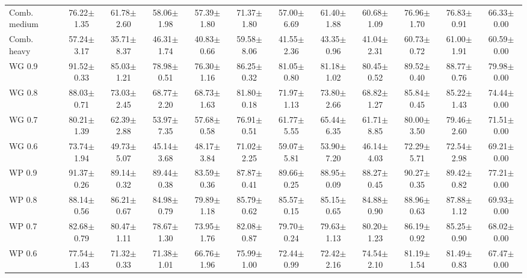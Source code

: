 \begin{table}[!t]
{\begin{tabular}{lccccccccccc}
Comb. medium & 76.22$\pm$1.35 & 61.78$\pm$2.60 & 58.06$\pm$1.98 & 57.39$\pm$1.80 & 71.37$\pm$1.80 & 57.00$\pm$6.69 & 61.40$\pm$1.88 & 60.68$\pm$1.09 & 76.96$\pm$1.70 & 76.83$\pm$0.91 & 66.33$\pm$0.00 \\
Comb. heavy & 57.24$\pm$3.17 & 35.71$\pm$8.37 & 46.31$\pm$1.74 & 40.83$\pm$0.66 & 59.58$\pm$8.06 & 41.55$\pm$2.36 & 43.35$\pm$0.96 & 41.04$\pm$2.31 & 60.73$\pm$0.72 & 61.00$\pm$1.91 & 60.59$\pm$0.00 \\
WG 0.9 & 91.52$\pm$0.33 & 85.03$\pm$1.21 & 78.98$\pm$0.51 & 76.30$\pm$1.16 & 86.25$\pm$0.32 & 81.05$\pm$0.80 & 81.18$\pm$1.02 & 80.45$\pm$0.52 & 89.52$\pm$0.40 & 88.77$\pm$0.76 & 79.98$\pm$0.00 \\
WG 0.8 & 88.03$\pm$0.71 & 73.03$\pm$2.45 & 68.77$\pm$2.20 & 68.73$\pm$1.63 & 81.80$\pm$0.18 & 71.97$\pm$1.13 & 73.80$\pm$2.66 & 68.82$\pm$1.27 & 85.84$\pm$0.45 & 85.22$\pm$1.43 & 74.44$\pm$0.00 \\
WG 0.7 & 80.21$\pm$1.39 & 62.39$\pm$2.88 & 53.97$\pm$7.35 & 57.68$\pm$0.58 & 76.91$\pm$0.51 & 61.77$\pm$5.55 & 65.44$\pm$6.35 & 61.71$\pm$8.85 & 80.00$\pm$3.50 & 79.46$\pm$2.60 & 71.51$\pm$0.00 \\
WG 0.6 & 73.74$\pm$1.94 & 49.73$\pm$5.07 & 45.14$\pm$3.68 & 48.17$\pm$3.84 & 71.02$\pm$2.25 & 59.07$\pm$5.81 & 53.90$\pm$7.20 & 46.14$\pm$4.03 & 72.29$\pm$5.71 & 72.54$\pm$2.98 & 69.21$\pm$0.00 \\
WP 0.9 & 91.37$\pm$0.26 & 89.14$\pm$0.32 & 89.44$\pm$0.38 & 83.59$\pm$0.36 & 87.87$\pm$0.41 & 89.66$\pm$0.25 & 88.95$\pm$0.09 & 88.27$\pm$0.45 & 90.27$\pm$0.35 & 89.42$\pm$0.82 & 77.21$\pm$0.00 \\
WP 0.8 & 88.14$\pm$0.56 & 86.21$\pm$0.67 & 84.98$\pm$0.79 & 79.89$\pm$1.18 & 85.79$\pm$0.62 & 85.57$\pm$0.15 & 85.15$\pm$0.65 & 84.88$\pm$0.90 & 88.96$\pm$0.63 & 87.88$\pm$1.12 & 69.93$\pm$0.00 \\
WP 0.7 & 82.68$\pm$0.79 & 80.47$\pm$1.11 & 78.67$\pm$1.30 & 73.95$\pm$1.76 & 82.08$\pm$0.87 & 79.70$\pm$0.24 & 79.63$\pm$1.13 & 80.20$\pm$1.23 & 86.19$\pm$0.92 & 85.25$\pm$0.90 & 68.02$\pm$0.00 \\
WP 0.6 & 77.54$\pm$1.43 & 71.32$\pm$0.33 & 71.38$\pm$1.01 & 66.76$\pm$1.96 & 75.99$\pm$1.00 & 72.44$\pm$0.99 & 72.42$\pm$2.16 & 74.54$\pm$2.10 & 81.19$\pm$1.54 & 81.49$\pm$0.83 & 67.47$\pm$0.00 \\
\hline
\end{tabular}}
\end{table}
